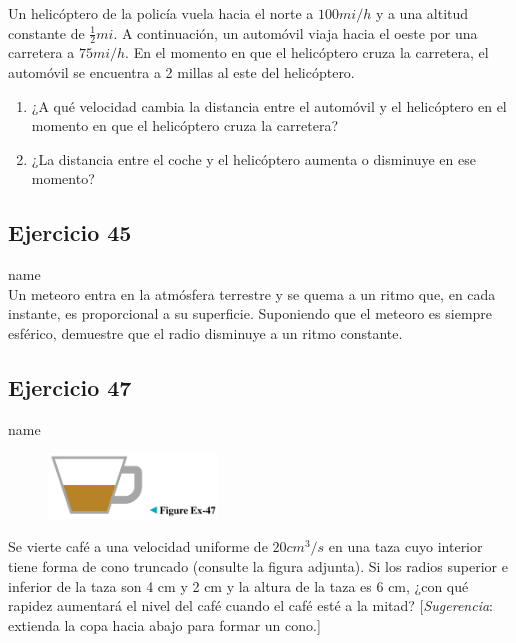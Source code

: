 \documentclass[12pt]{article}
\begin{document}
Un helicóptero de la policía vuela hacia el norte a $100 mi/h$ y a una altitud constante de $\frac{1}{2} mi$. A continuación, un automóvil viaja hacia el oeste por una carretera a $75 mi/h$. En el momento en que el helicóptero cruza la carretera, el automóvil se encuentra a 2 millas al este del helicóptero.
\begin{enumerate}
\item ¿A qué velocidad cambia la distancia entre el automóvil y el helicóptero en el momento en que el helicóptero cruza la carretera?
\item ¿La distancia entre el coche y el helicóptero aumenta o disminuye en ese momento?
\end{enumerate}

\subsection{Ejercicio 45} name \\

Un meteoro entra en la atmósfera terrestre y se quema a un ritmo que, en cada instante, es proporcional a su superficie. Suponiendo que el meteoro es siempre esférico, demuestre que el radio disminuye a un ritmo constante.

\subsection{Ejercicio 47} name \\

\begin{figure}[H]
\centering
\includegraphics[width=0.4\textwidth]{../img/img_Lista3/47.png}
\end{figure}
Se vierte café a una velocidad uniforme de $20 cm^3/s$ en una taza cuyo interior tiene forma de cono truncado (consulte la figura adjunta). Si los radios superior e inferior de la taza son 4 cm y 2 cm y la altura de la taza es 6 cm, ¿con qué rapidez aumentará el nivel del café cuando el café esté a la mitad? [\textit{Sugerencia}: extienda la copa hacia abajo para formar un cono.]
\end{document}
